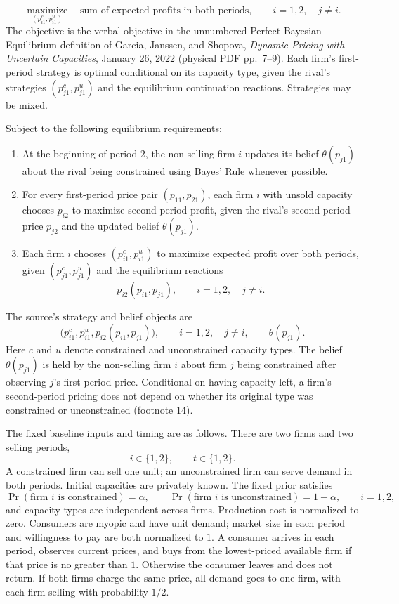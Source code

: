 \documentclass{article}
\begin{document}
\[
\underset{(p_{i1}^{c},p_{i1}^{u})}{\operatorname{maximize}}
\quad \text{sum of expected profits in both periods},
\qquad i=1,2,\quad j\ne i.
\]
The objective is the verbal objective in the unnumbered Perfect Bayesian Equilibrium definition of Garcia, Janssen, and Shopova, \emph{Dynamic Pricing with Uncertain Capacities}, January 26, 2022 (physical PDF pp.~7--9). Each firm's first-period strategy is optimal conditional on its capacity type, given the rival's strategies $(p_{j1}^{c},p_{j1}^{u})$ and the equilibrium continuation reactions. Strategies may be mixed.

Subject to the following equilibrium requirements:
\begin{enumerate}
\item At the beginning of period 2, the non-selling firm $i$ updates its belief $\theta(p_{j1})$ about the rival being constrained using Bayes' Rule whenever possible.
\item For every first-period price pair $(p_{11},p_{21})$, each firm $i$ with unsold capacity chooses $p_{i2}$ to maximize second-period profit, given the rival's second-period price $p_{j2}$ and the updated belief $\theta(p_{j1})$.
\item Each firm $i$ chooses $(p_{i1}^{c},p_{i1}^{u})$ to maximize expected profit over both periods, given $(p_{j1}^{c},p_{j1}^{u})$ and the equilibrium reactions
\[
p_{i2}(p_{i1},p_{j1}),\qquad i=1,2,\quad j\ne i.
\]
\end{enumerate}
The source's strategy and belief objects are
\[
\bigl(p_{i1}^{c},p_{i1}^{u},p_{i2}(p_{i1},p_{j1})\bigr),
\qquad i=1,2,\quad j\ne i,
\qquad \theta(p_{j1}).
\]
Here $c$ and $u$ denote constrained and unconstrained capacity types. The belief $\theta(p_{j1})$ is held by the non-selling firm $i$ about firm $j$ being constrained after observing $j$'s first-period price. Conditional on having capacity left, a firm's second-period pricing does not depend on whether its original type was constrained or unconstrained (footnote 14).

The fixed baseline inputs and timing are as follows. There are two firms and two selling periods,
\[
i\in\{1,2\},\qquad t\in\{1,2\}.
\]
A constrained firm can sell one unit; an unconstrained firm can serve demand in both periods. Initial capacities are privately known. The fixed prior satisfies
\[
\Pr(\text{firm }i\text{ is constrained})=\alpha,
\qquad
\Pr(\text{firm }i\text{ is unconstrained})=1-\alpha,
\qquad i=1,2,
\]
and capacity types are independent across firms. Production cost is normalized to zero. Consumers are myopic and have unit demand; market size in each period and willingness to pay are both normalized to $1$. A consumer arrives in each period, observes current prices, and buys from the lowest-priced available firm if that price is no greater than $1$. Otherwise the consumer leaves and does not return. If both firms charge the same price, all demand goes to one firm, with each firm selling with probability $1/2$.
\end{document}
